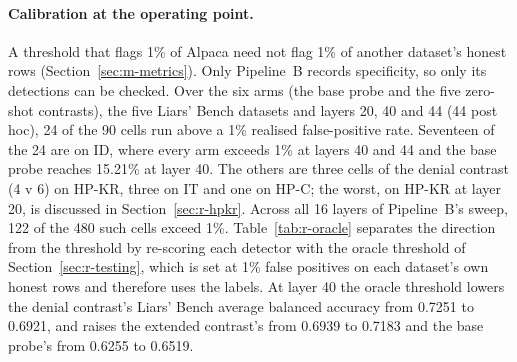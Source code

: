 \paragraph{Calibration at the operating point.}
A threshold that flags 1\% of Alpaca need not flag 1\% of another dataset's honest rows (Section~\ref{sec:m-metrics}).
Only Pipeline~B records specificity, so only its detections can be checked. %
Over the six arms (the base probe and the five zero-shot contrasts), the five Liars' Bench datasets and layers 20, 40 and 44 (44 post hoc), 24 of the 90 cells run above a 1\% realised false-positive rate. %
Seventeen of the 24 are on ID, where every arm exceeds 1\% at layers 40 and 44 and the base probe reaches 15.21\% at layer 40. %
The others are three cells of the denial contrast (4 v 6) on HP-KR, three on IT and one on HP-C; the worst, on HP-KR at layer 20, is discussed in Section~\ref{sec:r-hpkr}. %
Across all 16 layers of Pipeline~B's sweep, 122 of the 480 such cells exceed 1\%. %
Table~\ref{tab:r-oracle} separates the direction from the threshold by re-scoring each detector with the oracle threshold of Section~\ref{sec:r-testing}, which is set at 1\% false positives on each dataset's own honest rows and therefore uses the labels. %
At layer 40 the oracle threshold lowers the denial contrast's Liars' Bench average balanced accuracy from 0.7251 to 0.6921, and raises the extended contrast's from 0.6939 to 0.7183 and the base probe's from 0.6255 to 0.6519. %
